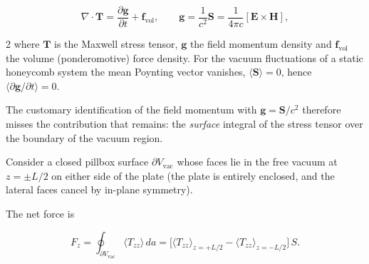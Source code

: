 \documentclass[twoside, 10pt]{article}
\begin{document}
\[
\nabla\cdot\mathbf{T} = \frac{\partial\mathbf{g}}{\partial t} + \mathbf{f}_{\mathrm{vol}},
\qquad
\mathbf{g} = \frac{1}{c^2}\mathbf{S} = \frac{1}{4\pi c}[\mathbf{E}\times\mathbf{H}],
\]
\begin{multicols}{2}
where $\mathbf{T}$ is the Maxwell stress tensor, $\mathbf{g}$ the field
momentum density and $\mathbf{f}_{\mathrm{vol}}$ the volume (ponderomotive)
force density. For the vacuum fluctuations of a static honeycomb system the
mean Poynting vector vanishes, $\langle\mathbf{S}\rangle = 0$, hence
$\langle\partial\mathbf{g}/\partial t\rangle = 0$.

 The customary identification
of the field momentum with $\mathbf{g} = \mathbf{S}/c^2$ therefore misses the
contribution that remains: the \emph{surface} integral of the stress tensor
over the boundary of the vacuum region.

Consider a closed pillbox surface $\partial V_{\mathrm{vac}}$ whose faces lie in
the free vacuum at $z = \pm L/2$ on either side of the plate (the plate is
entirely enclosed, and the lateral faces cancel by in-plane symmetry). 


The net
force is
\end{multicols}
\[
F_z = \oint_{\partial V_{\mathrm{vac}}} \langle T_{zz}\rangle \, da
= \big[\langle T_{zz}\rangle_{z=+L/2} - \langle T_{zz}\rangle_{z=-L/2}\big]\,S .
\]
\end{document}
